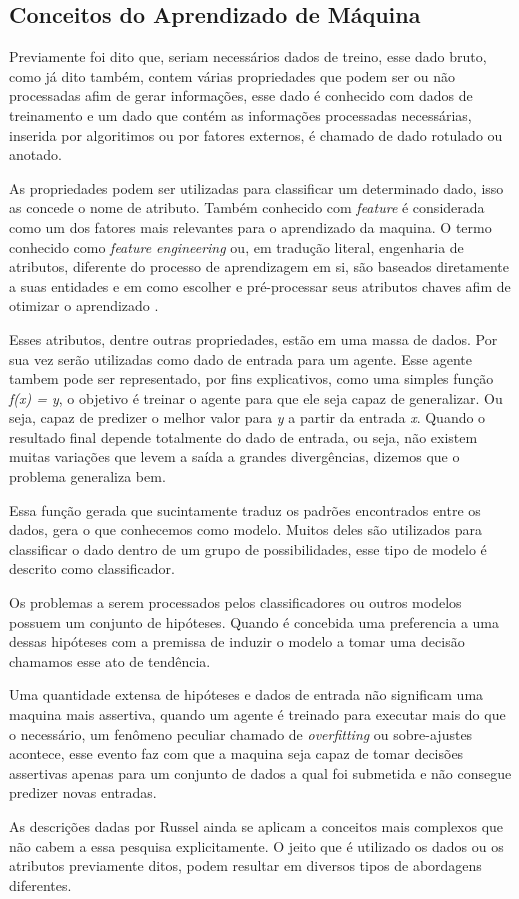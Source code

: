 \subsection{Conceitos do Aprendizado de Máquina}
Previamente foi dito que, seriam necessários dados de treino, esse dado bruto, como já dito também, contem várias propriedades que podem ser ou não processadas afim de gerar informações, esse dado é conhecido com dados de treinamento e um dado que contém as informações processadas necessárias, inserida por algoritimos ou por fatores externos, é chamado de dado rotulado ou anotado.

As propriedades podem ser utilizadas para classificar um determinado dado, isso as concede o nome de atributo. Também conhecido com \textit{feature} é considerada como um dos fatores mais relevantes para o aprendizado da maquina. O termo conhecido como \textit{feature engineering} ou, em tradução literal, engenharia de atributos, diferente do processo de aprendizagem em si, são baseados diretamente a suas entidades e em como escolher e pré-processar seus atributos chaves afim de otimizar o aprendizado \cite{domingos2012few}.

Esses atributos, dentre outras propriedades, estão em uma massa de dados. Por sua vez serão utilizadas como dado de entrada para um agente. Esse agente tambem pode ser representado, por fins explicativos, como uma simples função \textit{f(x) = y}, o objetivo é treinar o agente para que ele seja capaz de generalizar. Ou seja, capaz de predizer o melhor valor para \textit{y} a partir da entrada \textit{x}. Quando o resultado final depende totalmente do dado de entrada, ou seja, não existem muitas variações que levem a saída a grandes divergências, dizemos que o problema generaliza bem.

Essa função gerada que sucintamente traduz os padrões encontrados entre os dados, gera o que conhecemos como modelo. Muitos deles são utilizados para classificar o dado dentro de um grupo de possibilidades, esse tipo de modelo é descrito como classificador.

Os problemas a serem processados pelos classificadores ou outros modelos possuem um conjunto de  hipóteses. Quando é concebida uma preferencia a uma dessas hipóteses com a premissa de induzir o modelo a tomar uma decisão chamamos esse ato de tendência.

Uma quantidade extensa de hipóteses e dados de entrada não significam uma maquina mais assertiva, quando um agente é treinado para executar mais do que o necessário, um fenômeno peculiar chamado de \textit{overfitting} ou sobre-ajustes acontece, esse evento faz com que a maquina seja capaz de tomar decisões assertivas apenas para um conjunto de dados a qual foi submetida e não consegue predizer novas entradas.

As descrições dadas por Russel \cite[693]{russell2003artificial} ainda se aplicam a conceitos mais complexos que não cabem a essa pesquisa explicitamente. O jeito que é utilizado os dados ou os atributos previamente ditos, podem resultar em diversos tipos de abordagens diferentes.
